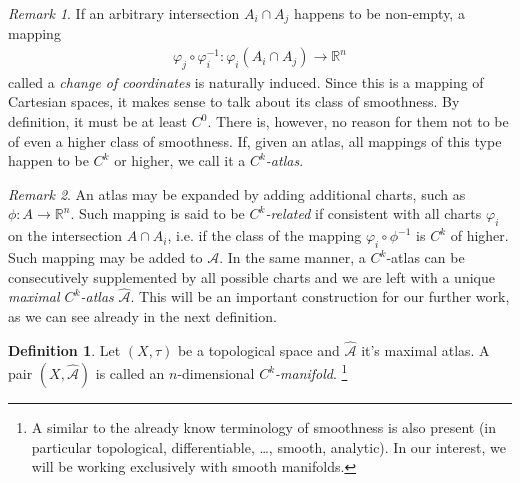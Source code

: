 \documentclass[a4paper,11pt]{article}
\theoremstyle{theorem}
\theoremstyle{remark}
\newtheorem*{remark}{Remark}
\theoremstyle{definition}
\newtheorem{definition}{Definition}
\begin{document}
		\begin{remark}
			If an arbitrary intersection $A_i \cap A_j$ happens to be non-empty, a mapping
			\begin{align*}
				\varphi_j \circ \varphi_i^{-1}: \varphi_i(A_i \cap A_j) \to \mathbb R^n
			\end{align*}
			called a \emph{change of coordinates} is naturally induced. Since this is a mapping of Cartesian spaces, it makes sense to talk about its class of smoothness. By definition, it must be at least $C^0$. There is, however, no reason for them not to be of even a higher class of smoothness. If, given an atlas, all mappings of this type happen to be $C^k$ or higher, we call it a \emph{$C^k$-atlas}.
		\end{remark}
		
		\begin{remark}
			An atlas may be expanded by adding additional charts, such as $\phi: A \to \mathbb R^n$. Such mapping is said to be \emph{$C^k$-related} if consistent with all charts $\varphi_i$ on the intersection $A \cap A_i$, i.e. if the class of the mapping $\varphi_i \circ \phi^{-1}$ is $C^k$ of higher. Such mapping may be added to $\mathcal A$. In the same manner, a $C^k$-atlas can be consecutively supplemented by all possible charts and we are left with a unique \emph{maximal $C^k$-atlas} $\hat{\mathcal A}$. This will be an important construction for our further work, as we can see already in the next definition.
		\end{remark}
	
		\begin{definition}
			Let $(X,\tau)$ be a topological space and $\hat{\mathcal A}$ it's maximal atlas. A pair $(X,\hat{\mathcal A})$ is called an $n$-dimensional \emph{$C^k$-manifold}.%
				\footnote{A similar to the already know terminology of smoothness is also present (in particular topological, differentiable, \dots, smooth, analytic). In our interest, we will be working exclusively with smooth manifolds.}
		\end{definition}
	
\end{document}
